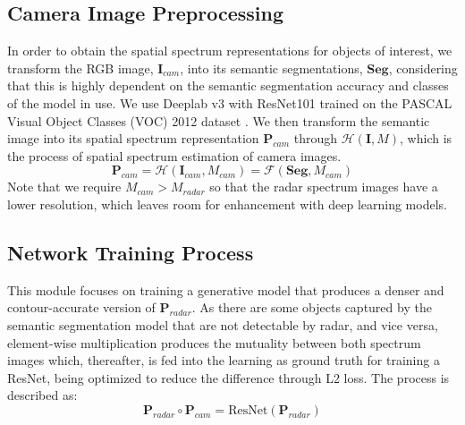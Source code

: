 \subsection{Camera Image Preprocessing}
In order to obtain the spatial spectrum representations for objects of interest, we transform the RGB image, $\textbf{I}_{cam}$, into its semantic segmentations, $\textbf{Seg}$, considering that this is highly dependent on the semantic segmentation accuracy and classes of the model in use. We use Deeplab v3 \cite{yurtkulu2019semantic} with ResNet101 \cite{chen2017rethinking} trained on the PASCAL Visual Object Classes (VOC) 2012 dataset \cite{Everingham10}. We then transform the semantic image into its spatial spectrum representation $\textbf{P}_{cam}$ through $\mathscr{H}(\textbf{I}, M)$, which is the process of spatial spectrum estimation of camera images.
\begin{equation}
    \textbf{P}_{cam}=\mathscr{H}(\textbf{I}_{cam}, M_{cam})=\mathscr{F}(\textbf{Seg}, M_{cam})
\end{equation}
Note that we require $M_{cam} > M_{radar}$ so that the radar spectrum images have a lower resolution, which leaves room for enhancement with deep learning models. 


\subsection{Network Training Process}
This module focuses on training a generative model that produces a denser and contour-accurate version of $\textbf{P}_{radar}$. As there are some objects captured by the semantic segmentation model that are not detectable by radar, and vice versa, element-wise multiplication produces the mutuality between both spectrum images which, thereafter, is fed into the learning as ground truth for training a ResNet, being optimized to reduce the difference through L2 loss. The process is described as:
\begin{equation}
    \textbf{P}_{radar} \circ \textbf{P}_{cam} = \text{ResNet}(\textbf{P}_{radar})
\end{equation}